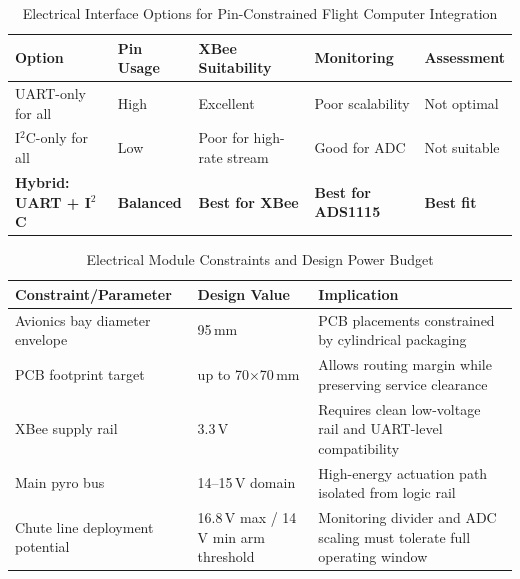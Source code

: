 \begin{table}[!htbp]
  \centering
  \caption{Electrical Interface Options for Pin-Constrained Flight Computer Integration}
  \label{tab:electrical_protocol_compare}
  \small
  \begin{tabular}{@{}p{3cm}|p{2.5cm}|p{2.5cm}|p{2.5cm}|p{2.5cm}@{}}
    \toprule
    \rowcolor{gray!22}\textbf{Option} & \textbf{Pin Usage} & \textbf{XBee Suitability} & \textbf{Monitoring} & \textbf{Assessment} \\ \midrule
    UART-only for all & High & Excellent & Poor scalability & Not optimal \\
    I$^2$C-only for all & Low & Poor for high-rate stream & Good for ADC & Not suitable \\
    \textbf{Hybrid: UART + I$^2$C} & \textbf{Balanced} & \textbf{Best for XBee} & \textbf{Best for ADS1115} & \textbf{Best fit} \\ \bottomrule
  \end{tabular}
\end{table}

\begin{table}[!htbp]
  \centering
  \caption{Electrical Module Constraints and Design Power Budget}
  \label{tab:electrical_constraints_power}
  \small
  \begin{tabular}{@{}p{4cm}|p{3cm}|p{6cm}@{}}
    \toprule
    \rowcolor{gray!22}\textbf{Constraint/Parameter} & \textbf{Design Value} & \textbf{Implication} \\ \midrule
    Avionics bay diameter envelope & 95\,mm & PCB placements constrained by cylindrical packaging \\
    PCB footprint target & up to 70$\times$70\,mm & Allows routing margin while preserving service clearance \\
    XBee supply rail & 3.3\,V & Requires clean low-voltage rail and UART-level compatibility \\
    Main pyro bus & 14--15\,V domain & High-energy actuation path isolated from logic rail \\
    Chute line deployment potential & 16.8\,V max / 14\,V min arm threshold & Monitoring divider and ADC scaling must tolerate full operating window \\ \bottomrule
  \end{tabular}
\end{table}

